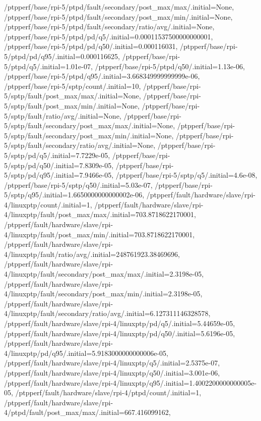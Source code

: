{    /ptpperf/base/rpi-5/ptpd/fault/secondary/post_max/max/.initial=None,
    /ptpperf/base/rpi-5/ptpd/fault/secondary/post_max/min/.initial=None,
    /ptpperf/base/rpi-5/ptpd/fault/secondary/ratio/avg/.initial=None,
    /ptpperf/base/rpi-5/ptpd/pd/q5/.initial=0.00011537500000000001,
    /ptpperf/base/rpi-5/ptpd/pd/q50/.initial=0.000116031,
    /ptpperf/base/rpi-5/ptpd/pd/q95/.initial=0.000116625,
    /ptpperf/base/rpi-5/ptpd/q5/.initial=1.01e-07,
    /ptpperf/base/rpi-5/ptpd/q50/.initial=1.13e-06,
    /ptpperf/base/rpi-5/ptpd/q95/.initial=3.668349999999999e-06,
    /ptpperf/base/rpi-5/sptp/count/.initial=10,
    /ptpperf/base/rpi-5/sptp/fault/post_max/max/.initial=None,
    /ptpperf/base/rpi-5/sptp/fault/post_max/min/.initial=None,
    /ptpperf/base/rpi-5/sptp/fault/ratio/avg/.initial=None,
    /ptpperf/base/rpi-5/sptp/fault/secondary/post_max/max/.initial=None,
    /ptpperf/base/rpi-5/sptp/fault/secondary/post_max/min/.initial=None,
    /ptpperf/base/rpi-5/sptp/fault/secondary/ratio/avg/.initial=None,
    /ptpperf/base/rpi-5/sptp/pd/q5/.initial=7.7229e-05,
    /ptpperf/base/rpi-5/sptp/pd/q50/.initial=7.8309e-05,
    /ptpperf/base/rpi-5/sptp/pd/q95/.initial=7.9466e-05,
    /ptpperf/base/rpi-5/sptp/q5/.initial=4.6e-08,
    /ptpperf/base/rpi-5/sptp/q50/.initial=5.03e-07,
    /ptpperf/base/rpi-5/sptp/q95/.initial=1.6650000000000002e-06,
    /ptpperf/fault/hardware/slave/rpi-4/linuxptp/count/.initial=1,
    /ptpperf/fault/hardware/slave/rpi-4/linuxptp/fault/post_max/max/.initial=703.8718622170001,
    /ptpperf/fault/hardware/slave/rpi-4/linuxptp/fault/post_max/min/.initial=703.8718622170001,
    /ptpperf/fault/hardware/slave/rpi-4/linuxptp/fault/ratio/avg/.initial=248761923.38469696,
    /ptpperf/fault/hardware/slave/rpi-4/linuxptp/fault/secondary/post_max/max/.initial=2.3198e-05,
    /ptpperf/fault/hardware/slave/rpi-4/linuxptp/fault/secondary/post_max/min/.initial=2.3198e-05,
    /ptpperf/fault/hardware/slave/rpi-4/linuxptp/fault/secondary/ratio/avg/.initial=6.127311146328578,
    /ptpperf/fault/hardware/slave/rpi-4/linuxptp/pd/q5/.initial=5.44659e-05,
    /ptpperf/fault/hardware/slave/rpi-4/linuxptp/pd/q50/.initial=5.6196e-05,
    /ptpperf/fault/hardware/slave/rpi-4/linuxptp/pd/q95/.initial=5.9183000000000006e-05,
    /ptpperf/fault/hardware/slave/rpi-4/linuxptp/q5/.initial=2.5375e-07,
    /ptpperf/fault/hardware/slave/rpi-4/linuxptp/q50/.initial=3.001e-06,
    /ptpperf/fault/hardware/slave/rpi-4/linuxptp/q95/.initial=1.4002200000000005e-05,
    /ptpperf/fault/hardware/slave/rpi-4/ptpd/count/.initial=1,
    /ptpperf/fault/hardware/slave/rpi-4/ptpd/fault/post_max/max/.initial=667.416099162,
}
